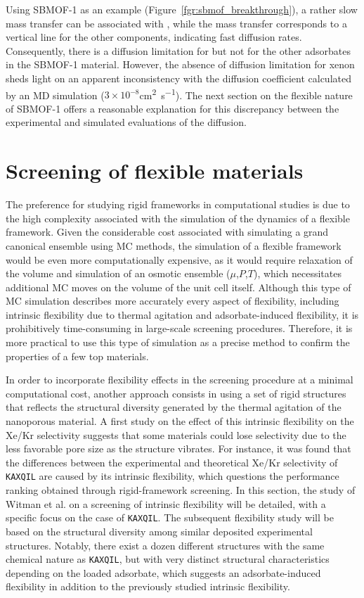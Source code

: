 \documentclass[main]{subfiles}
\begin{document}
Using SBMOF-1 as an example (Figure~\ref{fgr:sbmof_breakthrough}), a rather slow mass transfer can be associated with , while the mass transfer corresponds to a vertical line for the other components, indicating fast diffusion rates. Consequently, there is a diffusion limitation for  but not for the other adsorbates in the SBMOF-1 material. However, the absence of diffusion limitation for xenon sheds light on an apparent inconsistency with the diffusion coefficient calculated by an MD simulation ($3\times 10^{-8}$\si{\square\cm\per\s}). The next section on the flexible nature of SBMOF-1 offers a reasonable explanation for this discrepancy between the experimental and simulated evaluations of the diffusion.

\section{Screening of flexible materials}

The preference for studying rigid frameworks in computational studies is due to the high complexity associated with the simulation of the dynamics of a flexible framework. Given the considerable cost associated with simulating a grand canonical ensemble using MC methods, the simulation of a flexible framework would be even more computationally expensive, as it would require relaxation of the volume and simulation of an osmotic ensemble ($\mu$,$P$,$T$), which necessitates additional MC moves on the volume of the unit cell itself.\autocite{Bousquet2012} Although this type of MC simulation describes more accurately every aspect of flexibility, including intrinsic flexibility due to thermal agitation and adsorbate-induced flexibility, it is prohibitively time-consuming in large-scale screening procedures. Therefore, it is more practical to use this type of simulation as a precise method to confirm the properties of a few top materials.

In order to incorporate flexibility effects in the screening procedure at a minimal computational cost, another approach consists in using a set of rigid structures that reflects the structural diversity generated by the thermal agitation of the nanoporous material. A first study on the effect of this intrinsic flexibility on the Xe/Kr selectivity suggests that some materials could lose selectivity due to the less favorable pore size as the structure vibrates.\autocite{Witman_2017} For instance, it was found that the differences between the experimental and theoretical Xe/Kr selectivity of \texttt{KAXQIL}\autocite{KAXQIL} are caused by its intrinsic flexibility, which questions the performance ranking obtained through rigid-framework screening. In this section, the study of Witman et al.\autocite{Witman_2017} on a screening of intrinsic flexibility will be detailed, with a specific focus on the case of \texttt{KAXQIL}. The subsequent flexibility study will be based on the structural diversity among similar deposited experimental structures. Notably, there exist a dozen different structures with the same chemical nature as \texttt{KAXQIL}, but with very distinct structural characteristics depending on the loaded adsorbate, which suggests an adsorbate-induced flexibility in addition to the previously studied intrinsic flexibility. 
\end{document}
